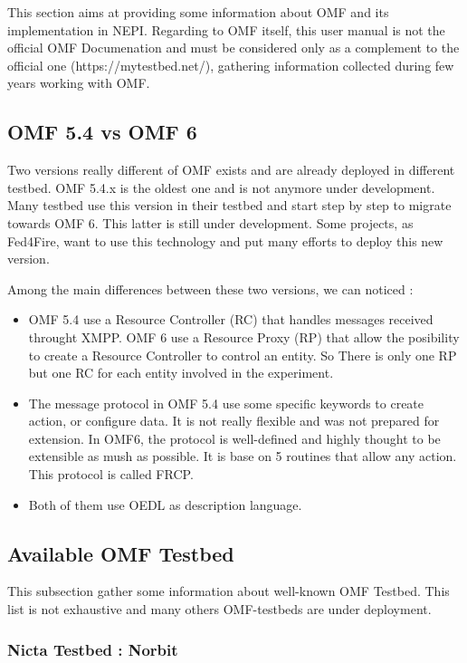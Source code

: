 This section aims at providing some information about OMF and its implementation in NEPI. Regarding to OMF itself, this user manual is not the official OMF Documenation and must be considered only as a complement to the official one (https://mytestbed.net/), gathering information collected during few years working with OMF.

\subsection{OMF 5.4 vs OMF 6}

Two versions really different of OMF exists and are already deployed in different testbed. OMF 5.4.x is the oldest one and is not anymore under development. Many testbed use this version in their testbed and start step by step to migrate towards OMF 6. This latter is still under development. Some projects, as Fed4Fire, want to use this technology and put many efforts to deploy this new version. 

Among the main differences between these two versions, we can noticed :
\begin{itemize}
\item OMF 5.4 use a Resource Controller (RC) that handles messages received throught XMPP. OMF 6 use a Resource Proxy (RP) that allow the posibility to create a Resource Controller to control an entity. So There is only one RP but one RC for each entity involved in the experiment.
\item The message protocol in OMF 5.4 use some specific keywords to create action, or configure data. It is not really flexible and was not prepared for extension. In OMF6, the protocol is well-defined and highly thought to be extensible as mush as possible. It is base on 5 routines that allow any action. This protocol is called FRCP.
\item Both of them use OEDL as description language. 
\end{itemize}

\subsection{Available OMF Testbed}

This subsection gather some information about well-known OMF Testbed. This list is not exhaustive and many others OMF-testbeds are under deployment.

\subsubsection{Nicta Testbed : Norbit}

